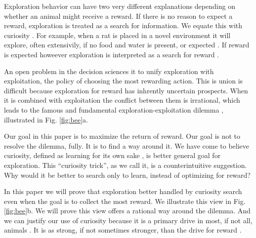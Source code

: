 Exploration behavior can have two very different explanations depending on whether an animal might receive a reward. If there is no reason to expect a reward, exploration is treated as a search for information. We equate this with curiosity \cite{Berlyne1950,Schmidhuber1991,Kidd2015,Jaegle2019,Sumner2019,Calhoun2014,Wang2019,Auersperg2015}. For example, when a rat is placed in a novel environment it will explore, often extensivily, if no food and water is present, or expected \cite{Berlyne1950}. If reward is expected howeever exploration is interpreted as a search for reward \cite{Gupta2006,Sutton2018,Woodgate2017,Lee2011a,Schulz2018a,Calhoun2014}.

An open problem in the decision sciences it to unify exploration with exploitation, the policy of choosing the most rewarding action. This is union is difficult because exploration for reward has inhrently uncertain prospects. When it is combined with exploitation the conflict between them is irrational, which leads to the famous and fundamental exploration-exploitation dilemma \citep{Kelly1956,Berger-Tal2014,Dayan1996,Thrun1992,Mehlhorn2015,Kobayashi2019}, illustrated in Fig. \ref{fig:bee}a.

Our goal in this paper is to maximize the return of reward. Our goal is not to resolve the dilemma, fully. It is to find a way around it. We have come to believe curiosity, defined as learning for its own sake \cite{Loewenstein1994,Kidd2015,Gopnik2020}, is better general goal for exploration. This ``curiosity trick'', as we call it, is a counterintuitive suggestion. Why would it be better to search only to learn, instead of optimizing for reward? 

In this paper we will prove that exploration better handled by curiosity search even when the goal is to collect the most reward. We illustrate this view in Fig. \ref{fig:bee}b. We will prove this view offers a rational way around the dilemma. And we can justify our use of curiosity because it is a primary drive in most, if not all, animals \cite{Berlyne1950,Loewenstein1994,Inglis2001}. It is as strong, if not sometimes stronger, than the drive for reward \cite{Loewenstein1994,Kidd2015,Gottlieb2018,Sumner2019,Gopnik2020,Song2019,Wang2019}.

